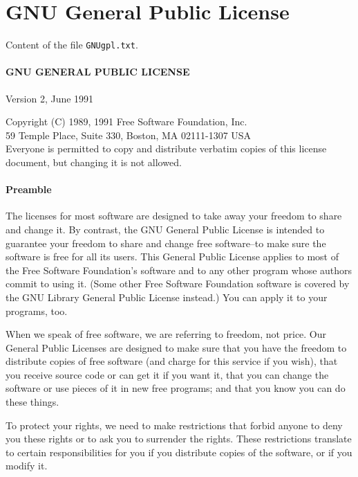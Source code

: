 \chapter{GNU General Public License}
\label{chap:gnugpl}

Content of the file {\tt GNUgpl.txt}.

\subsubsection*{GNU GENERAL PUBLIC LICENSE}

Version 2, June 1991

\noindent Copyright (C) 1989, 1991 Free Software Foundation, Inc. \\
59 Temple Place, Suite 330, Boston, MA 02111-1307 USA \\
Everyone is permitted to copy and distribute verbatim copies of this license
document, but changing it is not allowed.

\subsubsection*{Preamble}

  The licenses for most software are designed to take away your
freedom to share and change it.  By contrast, the GNU General Public
License is intended to guarantee your freedom to share and change free
software--to make sure the software is free for all its users.  This
General Public License applies to most of the Free Software
Foundation's software and to any other program whose authors commit to
using it.  (Some other Free Software Foundation software is covered by
the GNU Library General Public License instead.)  You can apply it to
your programs, too.

  When we speak of free software, we are referring to freedom, not
price.  Our General Public Licenses are designed to make sure that you
have the freedom to distribute copies of free software (and charge for
this service if you wish), that you receive source code or can get it
if you want it, that you can change the software or use pieces of it
in new free programs; and that you know you can do these things.

  To protect your rights, we need to make restrictions that forbid
anyone to deny you these rights or to ask you to surrender the rights.
These restrictions translate to certain responsibilities for you if you
distribute copies of the software, or if you modify it.

